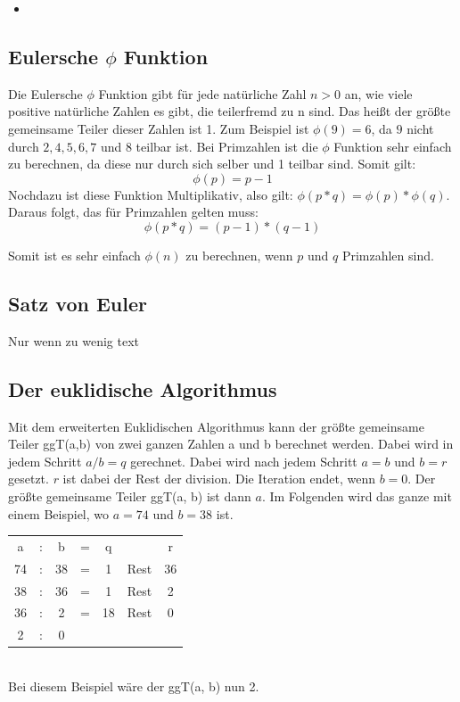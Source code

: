 \documentclass[12pt,a4paper]{scrartcl}
\begin{document}
	\begin{itemize}
	\item
	
	\end{itemize}
	
	\label{ch:einweg}
	\subsection{Eulersche $\phi$ Funktion}
	\label{cha:phi}
	
	Die Eulersche $\phi$ Funktion gibt für jede natürliche Zahl ${n > 0}$ an, wie viele positive natürliche Zahlen es gibt, die teilerfremd zu n sind. Das heißt der größte gemeinsame Teiler dieser Zahlen ist 1. Zum Beispiel ist ${\phi(9) = 6}$, da ${9}$ nicht durch ${2, 4, 5, 6, 7 }$ und $8$ teilbar ist. Bei Primzahlen ist die $\phi$ Funktion sehr einfach zu berechnen, da diese nur durch sich selber und 1 teilbar sind. Somit gilt: $${\phi(p) = p - 1}$$
	Nochdazu ist diese Funktion Multiplikativ, also gilt: ${\phi(p * q) = \phi(p) * \phi(q)}$.
	Daraus folgt, das für Primzahlen gelten muss:
	$${\phi(p * q) = (p - 1) * (q - 1)}$$
	
	Somit ist es sehr einfach $\phi(n)$ zu berechnen, wenn $p$ und $q$ Primzahlen sind.
	\subsection{Satz von Euler}
	Nur wenn zu wenig text
	
	\subsection{Der euklidische Algorithmus}
	 Mit dem erweiterten Euklidischen Algorithmus kann der größte gemeinsame Teiler ggT(a,b) von zwei ganzen Zahlen a und b berechnet werden.
	 Dabei wird in jedem Schritt $a / b = q$ gerechnet. Dabei wird nach jedem Schritt $a=b$ und $b = r$ gesetzt. $r$ ist dabei der Rest der division. Die Iteration endet, wenn $b=0$. Der größte gemeinsame Teiler ggT(a, b) ist dann $a$. Im Folgenden wird das ganze mit einem Beispiel, wo $a = 74$ und $b = 38$ ist. \\
	 \begin{tabular}{ c c c c c c c}
 		a & : & b & = & q & & r \\ 
 		74 & : & 38 & = & 1 & Rest & 36\\ 
 		38 & : & 36 & = & 1 & Rest & 2\\ 
 		36 & : & 2 & = & 18 & Rest & 0\\
 		2 & : & 0 & \\
	\end{tabular}\\
	Bei diesem Beispiel wäre der ggT(a, b) nun 2.
\end{document}
